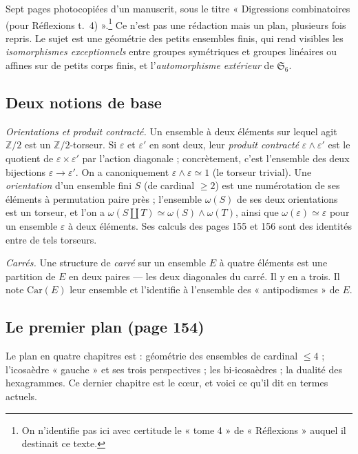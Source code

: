 \documentclass[11pt,a4paper]{article}
\begin{document}
Sept pages photocopiées d'un manuscrit, sous le titre « Digressions
combinatoires (pour Réflexions t.~4) ».\footnote{On n'identifie pas ici avec
certitude le « tome 4 » de « Réflexions » auquel il destinait ce texte.}
Ce n'est pas une rédaction mais un plan, plusieurs fois repris. Le sujet est
une géométrie des petits ensembles finis, qui rend visibles les
\emph{isomorphismes exceptionnels} entre groupes symétriques et groupes
linéaires ou affines sur de petits corps finis, et l'\emph{automorphisme
extérieur} de $\mathfrak{S}_6$.

\subsection*{Deux notions de base}

\emph{Orientations et produit contracté.} Un ensemble à deux éléments sur
lequel agit $\mathbb{Z}/2$ est un $\mathbb{Z}/2$-torseur. Si $\varepsilon$ et
$\varepsilon'$ en sont deux, leur \emph{produit contracté}
$\varepsilon \wedge \varepsilon'$ est le quotient de $\varepsilon \times
\varepsilon'$ par l'action diagonale ; concrètement, c'est l'ensemble des deux
bijections $\varepsilon \to \varepsilon'$. On a canoniquement
$\varepsilon \wedge \varepsilon \simeq 1$ (le torseur trivial). Une
\emph{orientation} d'un ensemble fini $S$ (de cardinal $\geqslant 2$) est une
numérotation de ses éléments à permutation paire près ; l'ensemble $\omega(S)$
de ses deux orientations est un torseur, et l'on a
$\omega(S \amalg T) \simeq \omega(S) \wedge \omega(T)$, ainsi que
$\omega(\varepsilon) \simeq \varepsilon$ pour un ensemble $\varepsilon$ à deux
éléments. Ses calculs des pages 155 et 156 sont des identités entre de tels
torseurs.

\emph{Carrés.} Une structure de \emph{carré} sur un ensemble $E$ à quatre
éléments est une partition de $E$ en deux paires — les deux diagonales du
carré. Il y en a trois. Il note $\mathrm{Car}(E)$ leur ensemble et l'identifie
à l'ensemble des « antipodismes » de $E$.

\subsection*{Le premier plan (page 154)}

Le plan en quatre chapitres est : géométrie des ensembles de cardinal
$\leqslant 4$ ; l'icosaèdre « gauche » et ses trois perspectives ; les
bi-icosaèdres ; la dualité des hexagrammes. Ce dernier chapitre est le cœur,
et voici ce qu'il dit en termes actuels.
\end{document}
